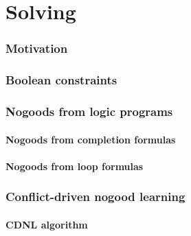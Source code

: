 \part{Solving}
\section{Motivation}


\section{Boolean constraints}

\section{Nogoods from logic programs}
\subsection{Nogoods from completion formulas}

\subsection{Nogoods from loop formulas}

\section{Conflict-driven nogood learning}




\subsection{CDNL algorithm}

